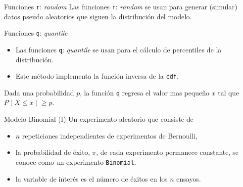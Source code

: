 \documentclass[
  ignorenonframetext,
  aspectratio=169,
  spanish,
]{beamer}
\begin{document}
\begin{frame}[fragile]{Funciones \texttt{r}: \emph{random}}
\label{funciones-r-random}
Las funciones \texttt{r}: \emph{random} se usan para generar (simular)
datos pseudo aleatorios que siguen la distribución del modelo.
\end{frame}

\begin{frame}[fragile]{Funciones \texttt{q}: \emph{quantile}}
\label{funciones-q-quantile}
\begin{itemize}
\item
  Las funciones \texttt{q}: \emph{quantile} se usan para el cálculo de
  percentiles de la distribución.
\item
  Este método implementa la función inversa de la \texttt{cdf}.
\end{itemize}

\begin{tcolorbox}[enhanced jigsaw, toprule=.15mm, bottomrule=.15mm, left=2mm, bottomtitle=1mm, leftrule=.75mm, opacitybacktitle=0.6, breakable, titlerule=0mm, title=\textcolor{quarto-callout-important-color}{\faExclamation}\hspace{0.5em}{Importante}, rightrule=.15mm, colback=white, toptitle=1mm, coltitle=black, colbacktitle=quarto-callout-important-color!10!white, arc=.35mm, opacityback=0, colframe=quarto-callout-important-color-frame]

Dada una probabilidad \(p\), la función \texttt{q} regresa el valor mas
pequeño \(x\) tal que \(P(X\leq x )\ge p\).

\end{tcolorbox}
\end{frame}

\begin{frame}[fragile]{Modelo Binomial (I)}
\label{modelo-binomial-i}
Un experimento aleatorio que consiste de

\begin{itemize}
\item
  \(n\) repeticiones independientes de experimentos de Bernoulli,
\item
  la probabilidad de éxito, \(\pi\), de cada experimento permanece
  constante, se conoce como un experimento \texttt{Binomial}.
\item
  la variable de interés es el número de éxitos en los \(n\) ensayos.
\end{itemize}
\end{frame}
\end{document}
